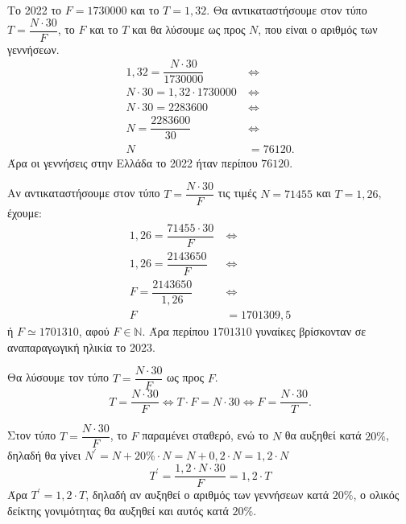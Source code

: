 
\begin{alist}
\item Το 2022 το $F = 1730000$ και το $T = 1,32$. Θα αντικαταστήσουμε στον τύπο $T = \dfrac{N \cdot 30}{F}$, το $F$ και το $T$ και θα λύσουμε ως προς $N$, που είναι ο αριθμός των γεννήσεων.
\begin{align*}
1,32 = \dfrac{N \cdot 30}{1730000} \ &\Leftrightarrow \\
N \cdot 30 = 1,32 \cdot 1730000 \ &\Leftrightarrow \\
N \cdot 30 = 2283600 \ &\Leftrightarrow \\
N = \dfrac{2283600}{30} \ &\Leftrightarrow \\
N &= 76120.
\end{align*}
Άρα οι γεννήσεις στην Ελλάδα το 2022 ήταν περίπου $76120$.

\item Αν αντικαταστήσουμε στον τύπο $T = \dfrac{N \cdot 30}{F}$ τις τιμές $N = 71455$ και $T = 1,26$, έχουμε:
\begin{align*}
1,26 = \dfrac{71455 \cdot 30}{F} \ &\Leftrightarrow \\
1,26 = \dfrac{2143650}{F} \ &\Leftrightarrow \\
F = \dfrac{2143650}{1,26} \ &\Leftrightarrow \\
F &= 1701309,5
\end{align*}
ή $F \simeq 1701310$, αφού $F \in \mathbb{N}$. Άρα περίπου $1701310$ γυναίκες βρίσκονταν σε αναπαραγωγική ηλικία το 2023.

\item Θα λύσουμε τον τύπο $T = \dfrac{N \cdot 30}{F}$ ως προς $F$.
\[T = \dfrac{N \cdot 30}{F} \Leftrightarrow T \cdot F = N \cdot 30 \Leftrightarrow F = \dfrac{N \cdot 30}{T}.\]

\item Στον τύπο $T = \dfrac{N \cdot 30}{F}$, το $F$ παραμένει σταθερό, ενώ το $N$ θα αυξηθεί κατά $20\%$, δηλαδή θα γίνει $N^\prime = N + 20\% \cdot N = N + 0,2 \cdot N = 1,2 \cdot N$
\[T^\prime = \dfrac{1,2 \cdot N \cdot 30}{F} = 1,2 \cdot T\]
Άρα $T^\prime = 1,2 \cdot T$, δηλαδή αν αυξηθεί ο αριθμός των γεννήσεων κατά $20\%$, ο ολικός δείκτης γονιμότητας θα αυξηθεί και αυτός κατά $20\%$.
\end{alist}

